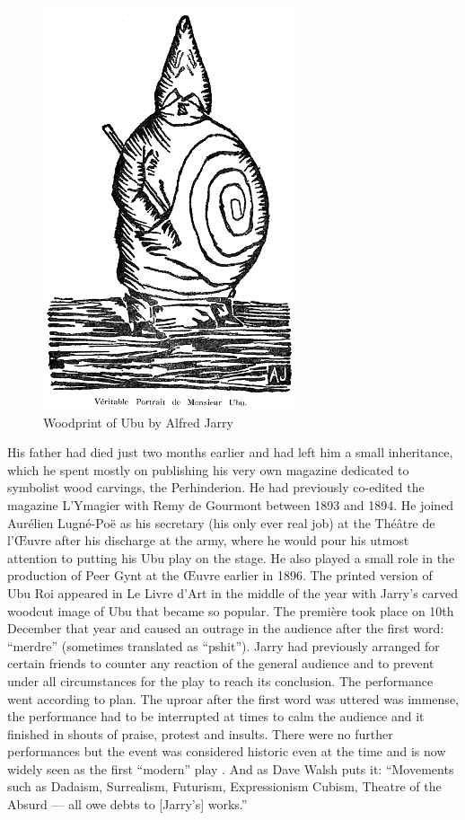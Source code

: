 \begin{figure}[htb] %
  \centering
  \includegraphics[height=0.3\textheight]{images/ubu}
  \caption[Ubu]{Woodprint of Ubu by Alfred Jarry}
\label{fig:UBU}
\end{figure}

His father had died just two months earlier and had left him a small inheritance, which he spent mostly on publishing his very own magazine dedicated to symbolist wood carvings, the Perhinderion. He had previously co-edited the magazine L'Ymagier with Remy de Gourmont between 1893 and 1894. He joined Aurélien Lugné-Poë as his secretary (his only ever real job) at the Théâtre de l'Œuvre after his discharge at the army, where he would pour his utmost attention to putting his Ubu play on the stage. He also played a small role in the production of Peer Gynt at the Œuvre earlier in 1896. The printed version of Ubu Roi appeared in Le Livre d'Art in the middle of the year with Jarry's carved woodcut image of Ubu that became so popular. The première took place on 10th December that year and caused an outrage in the audience after the first word: ``merdre'' (sometimes translated as ``pshit''). Jarry had previously arranged for certain friends to counter any reaction of the general audience and to prevent under all circumstances for the play to reach its conclusion. The performance went according to plan. The uproar after the first word was uttered was immense, the performance had to be interrupted at times to calm the audience and it finished in shouts of praise, protest and insults. There were no further performances but the event was considered historic even at the time and is now widely seen as the first ``modern'' play \autocite[p.168-169]{Brotchie2011}. And as Dave Walsh puts it: ``Movements such as Dadaism, Surrealism, Futurism, Expressionism Cubism, Theatre of the Absurd --- all owe debts to [Jarry's] works.'' \autocite{Walsh2001}

